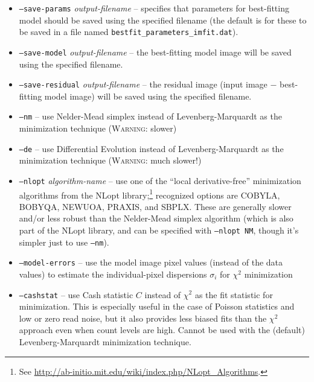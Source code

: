 \documentclass[10pt,a4paper,article]{memoir}
\newcommand{\chisquare}{\ensuremath{\chi^{2}}}
\begin{document}
\begin{itemize}
\bigskip

\item \texttt{--save-params} \textit{output-filename} -- specifies that parameters 
for best-fitting model should be saved using the specified filename (the default is
for these to be saved in a file named \texttt{bestfit\_parameters\_imfit.dat}).
\item \texttt{--save-model} \textit{output-filename} -- the best-fitting model image
will be saved using the specified filename.
\item \texttt{--save-residual} \textit{output-filename} -- the residual image (input
image $-$ best-fitting model image) will be saved using the specified filename.

\bigskip

\item \texttt{--nm} -- use Nelder-Mead simplex instead of Levenberg-Marquardt as
the minimization technique (\textsc{Warning}: slower)

\item \texttt{--de} -- use Differential Evolution instead of Levenberg-Marquardt as
the minimization technique (\textsc{Warning}: much slower!)

\item \texttt{--nlopt} \textit{algorithm-name} -- use one of the
``local derivative-free'' minimization algorithms from the NLopt
library;\footnote{See
\url{http://ab-initio.mit.edu/wiki/index.php/NLopt_Algorithms}.}
recognized options are COBYLA, BOBYQA, NEWUOA, PRAXIS, and SBPLX. These
are generally slower and/or less robust than the Nelder-Mead simplex
algorithm (which is also part of the NLopt library, and can be specified
with \texttt{--nlopt NM}, though it's simpler just to use \texttt{--nm}).

\bigskip

\item \texttt{--model-errors} -- use the model image pixel values
(instead of the data values) to estimate the individual-pixel dispersions
$\sigma_{i}$ for \chisquare{} minimization

\item \texttt{--cashstat} -- use Cash statistic $C$ instead of \chisquare{}
as the fit statistic for minimization. This is especially useful in the
case of Poisson statistics and low or zero read noise, but it also provides less
biased fits than the \chisquare{} approach even when count levels are
high. Cannot be used with the (default) Levenberg-Marquardt minimization
technique.


\end{itemize}
\end{document}
